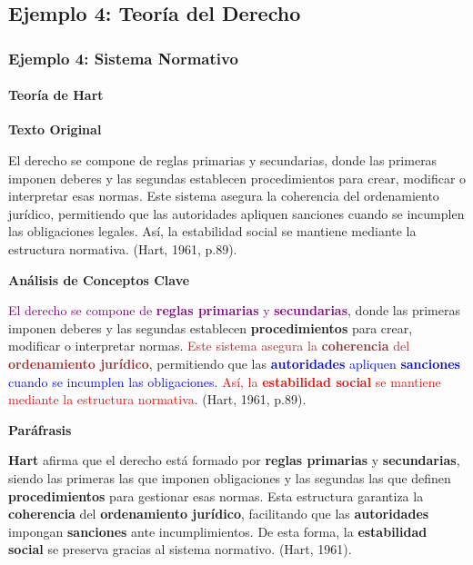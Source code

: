 \documentclass[aspectratio=169]{beamer}
\begin{document}
\subsection{Ejemplo 4: Teoría del Derecho}

\begin{frame}[allowframebreaks]
	\frametitle{Ejemplo 4: Sistema Normativo}
	\framesubtitle{Teoría de Hart}
	
	\textbf{Texto Original}
	\begin{block}{}
		\small
		El derecho se compone de reglas primarias y secundarias, donde las primeras imponen deberes y las segundas establecen procedimientos para crear, modificar o interpretar esas normas. Este sistema asegura la coherencia del ordenamiento jurídico, permitiendo que las autoridades apliquen sanciones cuando se incumplen las obligaciones legales. Así, la estabilidad social se mantiene mediante la estructura normativa. (Hart, 1961, p.89).
	\end{block}
	
	\framebreak
	
	\textbf{Análisis de Conceptos Clave}
	\begin{block}{}
		\small
		\textcolor{purple}{El derecho se compone de \textbf{reglas primarias} y \textbf{secundarias}}, donde las primeras imponen deberes y las segundas establecen \textbf{procedimientos} para crear, modificar o interpretar normas. \textcolor{brown}{Este sistema asegura la \textbf{coherencia} del \textbf{ordenamiento jurídico}}, permitiendo que las \textcolor{blue}{\textbf{autoridades} apliquen \textbf{sanciones} cuando se incumplen las obligaciones}. \textcolor{red}{Así, la \textbf{estabilidad social} se mantiene mediante la estructura normativa}. (Hart, 1961, p.89).
	\end{block}
	
	\framebreak
	
	\textbf{Paráfrasis}
	\begin{block}{}
		\small
		\textbf{Hart} afirma que el derecho está formado por \textbf{reglas primarias} y \textbf{secundarias}, siendo las primeras las que imponen obligaciones y las segundas las que definen \textbf{procedimientos} para gestionar esas normas. Esta estructura garantiza la \textbf{coherencia} del \textbf{ordenamiento jurídico}, facilitando que las \textbf{autoridades} impongan \textbf{sanciones} ante incumplimientos. De esta forma, la \textbf{estabilidad social} se preserva gracias al sistema normativo. (Hart, 1961).
	\end{block}
\end{frame}
\end{document}
